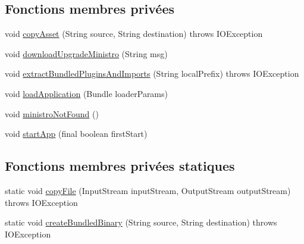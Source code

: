 \subsection*{Fonctions membres privées}
\begin{DoxyCompactItemize}
\item 
void \hyperlink{classorg_1_1qtproject_1_1qt5_1_1android_1_1bindings_1_1_qt_activity_a59050af1b747e4f7e5d68f5627ae94c9}{copy\-Asset} (String source, String destination)  throws I\-O\-Exception     
\item 
void \hyperlink{classorg_1_1qtproject_1_1qt5_1_1android_1_1bindings_1_1_qt_activity_abbade298e1a223acb5900e1ddd6ace74}{download\-Upgrade\-Ministro} (String msg)
\item 
void \hyperlink{classorg_1_1qtproject_1_1qt5_1_1android_1_1bindings_1_1_qt_activity_a38024ae043417efcc1b79aec389042b0}{extract\-Bundled\-Plugins\-And\-Imports} (String local\-Prefix)  throws I\-O\-Exception     
\item 
void \hyperlink{classorg_1_1qtproject_1_1qt5_1_1android_1_1bindings_1_1_qt_activity_aa72e2a52d4667eac2de67b9148c5332b}{load\-Application} (Bundle loader\-Params)
\item 
void \hyperlink{classorg_1_1qtproject_1_1qt5_1_1android_1_1bindings_1_1_qt_activity_a5e703f667905e2a0c11117197560d4e4}{ministro\-Not\-Found} ()
\item 
void \hyperlink{classorg_1_1qtproject_1_1qt5_1_1android_1_1bindings_1_1_qt_activity_a278365425c88a7b98bfcaf86b9a5a6ff}{start\-App} (final boolean first\-Start)
\end{DoxyCompactItemize}
\subsection*{Fonctions membres privées statiques}
\begin{DoxyCompactItemize}
\item 
static void \hyperlink{classorg_1_1qtproject_1_1qt5_1_1android_1_1bindings_1_1_qt_activity_a24e86e92cae2290e764995e64550f387}{copy\-File} (Input\-Stream input\-Stream, Output\-Stream output\-Stream)  throws I\-O\-Exception     
\item 
static void \hyperlink{classorg_1_1qtproject_1_1qt5_1_1android_1_1bindings_1_1_qt_activity_abfd0a80966d866beca1cfc2bc0b07b29}{create\-Bundled\-Binary} (String source, String destination)  throws I\-O\-Exception     
\end{DoxyCompactItemize}

